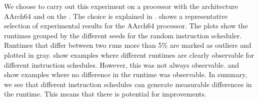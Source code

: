 We choose to carry out this experiment on a processor with the architecture AArch64 and on the \aurora{}.
The choice is explained in .
 shows a representative selection of experimental results for the AArch64 processor.
The plots show the runtimes grouped by the different seeds for the random instruction scheduler.
Runtimes that differ between two runs more than 5\% are marked as outliers and plotted in gray.
 show examples where different runtimes are clearly observable for different instruction schedules.
However, this was not always observable.
 and  show examples where no difference in the runtime was observable.
In summary, we see that different instruction schedules can generate measurable differences in the runtime.
This means that there is potential for improvements.
